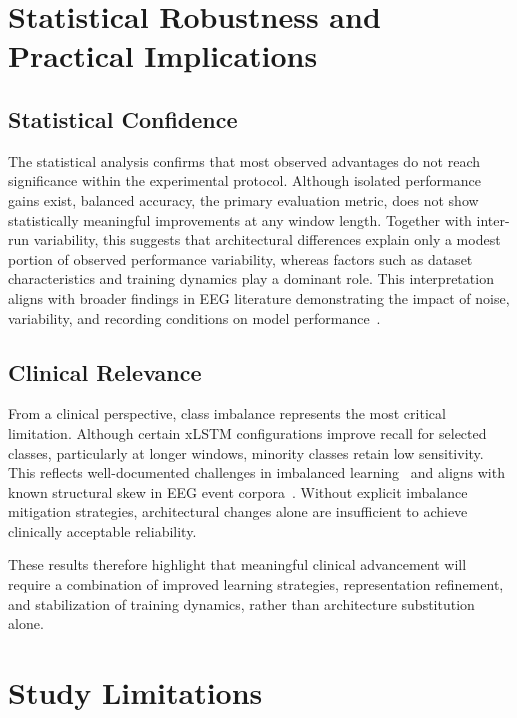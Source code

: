 \section{Statistical Robustness and Practical Implications}
\label{sec:critical_assessment}

\subsection{Statistical Confidence}
\label{sec:statistical_significance}

The statistical analysis confirms that most observed advantages do not reach significance within the experimental protocol. Although isolated performance gains exist, balanced accuracy, the primary evaluation metric, does not show statistically meaningful improvements at any window length. Together with inter-run variability, this suggests that architectural differences explain only a modest portion of observed performance variability, whereas factors such as dataset characteristics and training dynamics play a dominant role. This interpretation aligns with broader findings in \ac{EEG} literature demonstrating the impact of noise, variability, and recording conditions on model performance~\cite{banville2022robust}.

\subsection{Clinical Relevance}
\label{sec:class_imbalance}

From a clinical perspective, class imbalance represents the most critical limitation. Although certain \ac{xLSTM} configurations improve recall for selected classes, particularly at longer windows, minority classes retain low sensitivity. This reflects well-documented challenges in imbalanced learning~\cite{cui2019class,lin2017focal} and aligns with known structural skew in \ac{EEG} event corpora~\cite{obeid2016temple}. Without explicit imbalance mitigation strategies, architectural changes alone are insufficient to achieve clinically acceptable reliability.

These results therefore highlight that meaningful clinical advancement will require a combination of improved learning strategies, representation refinement, and stabilization of training dynamics, rather than architecture substitution alone.

\section{Study Limitations}
\label{sec:limitations}

